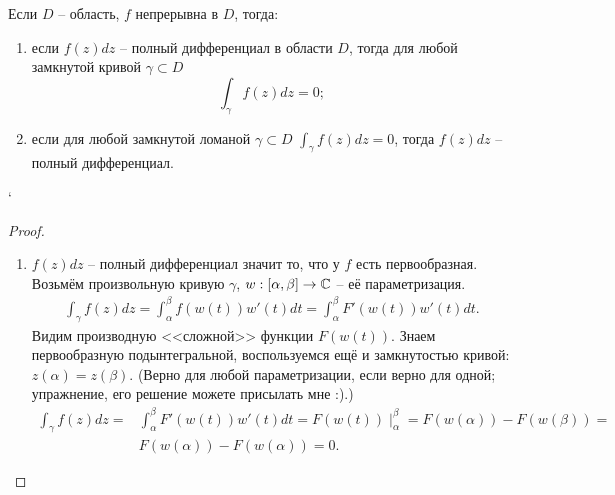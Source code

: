 \begin{theorem}
	Если $D$ -- область, $f$ непрерывна в $D$, тогда:
	\begin{enumerate}[label=(\arabic*)]
		\item если $f(z) dz$ -- полный дифференциал в области $D$, тогда для любой замкнутой кривой $\gamma \subset D$
		\[
			\int_\gamma f(z) dz = 0;
		\]
		\item если для любой замкнутой ломаной $\gamma \subset D$ $\int_\gamma f(z) dz = 0$, тогда $f(z) dz$ -- полный дифференциал.
	\end{enumerate}`
\end{theorem}
\begin{proof} \hfil
	\begin{enumerate}
		\item $f(z) dz$ -- полный дифференциал значит то, что у $f$ есть первообразная. Возьмём произвольную кривую $\gamma$, $w: [\alpha, \beta] \to \mathbb{C}$ -- её параметризация.
			\begin{align*}
				\int_\gamma f(z) dz = \int_\alpha^\beta f(w(t)) w'(t) dt = \int_\alpha^\beta F'(w(t)) w'(t) dt.
			\end{align*}
		Видим производную <<сложной>> функции $F(w(t))$. Знаем первообразную подынтегральной, воспользуемся ещё и замкнутостью кривой: $z(\alpha) = z(\beta)$. (Верно для любой параметризации, если верно для одной; упражнение, его решение можете присылать мне :).)
		\begin{align*}
			\int_\gamma f(z) dz = & \int_\alpha^\beta F'(w(t)) w'(t) dt = F(w(t)) \mid_\alpha^\beta = F(w(\alpha)) - F(w(\beta)) = \\
			& F(w(\alpha)) - F(w(\alpha)) = 0.
		\end{align*}
	

\end{enumerate}
\end{proof}
